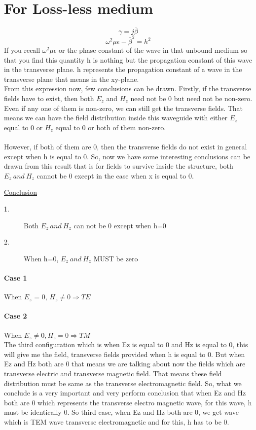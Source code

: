 \section{For Loss-less medium}
\begin{equation*}
\gamma = j\bar{\beta}
\end{equation*}
\begin{equation*}
\omega^2\mu\epsilon - \bar{\beta}^2 = h^2
\end{equation*}
If you recall $\omega^2\mu\epsilon$ or the phase constant of the wave in that unbound medium so that you find this quantity h is nothing but the propagation constant of this wave in the transverse plane. h represents the propagation constant of a wave in the transverse plane that means in the xy-plane.\\From this expression now, few conclusions can be drawn. Firstly, if the transverse fields have to exist, then both $E_z$ and $H_z$ need not be 0 but need not be non-zero. Even if any one of them is non-zero, we can still get the transverse fields. That means we can have the field distribution inside this waveguide with either $E_z$ equal to 0 or $H_z$ equal to 0 or both of them non-zero.\\
\\

However, if both of them are 0, then the transverse fields do not exist in general except when h is equal to 0. So, now we have some interesting conclusions can be drawn from this result that is for fields to survive inside the structure, both $E_z\ and\ H_z$ cannot be 0 except in the case when x is equal to 0.
\begin{center}
	\underline{Conclusion}
\end{center}
\begin{description}
	\item[1.] Both $E_z\ and\ H_z$ can not be 0 except when h=0
	\item[2.] When h=0, $E_z\ and\ H_z$ MUST be zero
\end{description}

\paragraph{Case 1}When $E_z$ = 0, $H_z \neq 0 \Rightarrow TE$
\paragraph{Case 2}When $E_z \neq 0, H_z = 0 \Rightarrow TM$\\
The third configuration which is when Ez is equal to 0 and Hz is equal to 0, this will give me the field, transverse fields provided when h is equal to 0. But when Ez and Hz both are 0 that means we are talking about now the fields which are transverse electric and transverse magnetic field. That means these field distribution must be same as the transverse electromagnetic field.
So, what we conclude is a very important and very perform conclusion that when Ez and Hz both are 0 which represents the transverse electro magnetic wave, for this wave, h must be identically 0. So third case, when Ez and Hz both are 0, we get wave which is TEM wave transverse electromagnetic and for this, h has to be 0.
